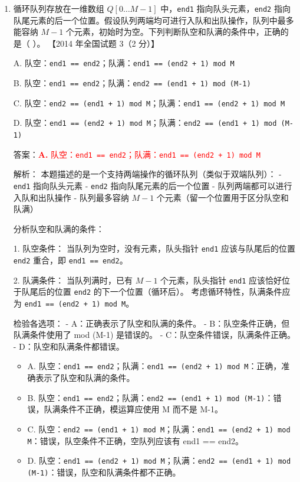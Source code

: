 \documentclass[lang=cn,newtx,10pt,scheme=chinese]{../../../elegantbook}
\begin{document}
\begin{enumerate}
    \item 循环队列存放在一维数组 $Q[0 \ldots M-1]$ 中，\texttt{end1} 指向队头元素，\texttt{end2} 指向队尾元素的后一个位置。假设队列两端均可进行入队和出队操作，队列中最多能容纳 $M-1$ 个元素，初始时为空。下列判断队空和队满的条件中，正确的是（ ）。  
    【2014 年全国试题 3（2 分）】  

    A. 队空：\texttt{end1 == end2}；队满：\texttt{end1 == (end2 + 1) mod M}  

    B. 队空：\texttt{end1 == end2}；队满：\texttt{end2 == (end1 + 1) mod (M-1)}  

    C. 队空：\texttt{end2 == (end1 + 1) mod M}；队满：\texttt{end1 == (end2 + 1) mod M}  

    D. 队空：\texttt{end1 == (end2 + 1) mod M}；队满：\texttt{end2 == (end1 + 1) mod (M-1)}  

    答案：\textcolor{red}{\textbf{A.} 队空：\texttt{end1 == end2}；队满：\texttt{end1 == (end2 + 1) mod M}}

    解析：
    本题描述的是一个支持两端操作的循环队列（类似于双端队列）：
    - \texttt{end1} 指向队头元素
    - \texttt{end2} 指向队尾元素的后一个位置
    - 队列两端都可以进行入队和出队操作
    - 队列最多容纳 $M-1$ 个元素（留一个位置用于区分队空和队满）

    分析队空和队满的条件：

    1. 队空条件：
       当队列为空时，没有元素，队头指针 \texttt{end1} 应该与队尾后的位置 \texttt{end2} 重合，即 \texttt{end1 == end2}。

    2. 队满条件：
       当队列满时，已有 $M-1$ 个元素，队头指针 \texttt{end1} 应该恰好位于队尾后的位置 \texttt{end2} 的下一个位置（循环后）。
       考虑循环特性，队满条件应为 \texttt{end1 == (end2 + 1) mod M}。

    检验各选项：
    - A：正确表示了队空和队满的条件。
    - B：队空条件正确，但队满条件使用了 mod (M-1) 是错误的。
    - C：队空条件错误，队满条件正确。
    - D：队空和队满条件都错误。

    \begin{itemize}
        \item A. 队空：\texttt{end1 == end2}；队满：\texttt{end1 == (end2 + 1) mod M}：正确，准确表示了队空和队满的条件。
        \item B. 队空：\texttt{end1 == end2}；队满：\texttt{end2 == (end1 + 1) mod (M-1)}：错误，队满条件不正确，模运算应使用 M 而不是 M-1。
        \item C. 队空：\texttt{end2 == (end1 + 1) mod M}；队满：\texttt{end1 == (end2 + 1) mod M}：错误，队空条件不正确，空队列应该有 end1 == end2。
        \item D. 队空：\texttt{end1 == (end2 + 1) mod M}；队满：\texttt{end2 == (end1 + 1) mod (M-1)}：错误，队空和队满条件都不正确。
    \end{itemize}


\end{enumerate}
\end{document}
